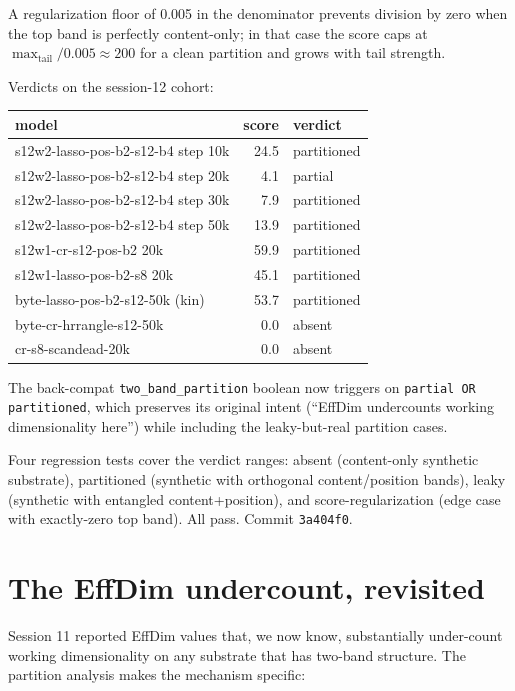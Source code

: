 \documentclass[11pt,openany]{book}
\begin{document}
A regularization floor of 0.005 in the denominator prevents division by
zero when the top band is perfectly content-only; in that case the score
caps at $\max_{\mathrm{tail}}/0.005 \approx 200$ for a clean partition and
grows with tail strength.

Verdicts on the session-12 cohort:

\begin{longtable}{lrl}
\toprule
model & score & verdict \\
\midrule
s12w2-lasso-pos-b2-s12-b4 step 10k  &  24.5 & partitioned \\
s12w2-lasso-pos-b2-s12-b4 step 20k  &   4.1 & partial \\
s12w2-lasso-pos-b2-s12-b4 step 30k  &   7.9 & partitioned \\
s12w2-lasso-pos-b2-s12-b4 step 50k  &  13.9 & partitioned \\
s12w1-cr-s12-pos-b2 20k             &  59.9 & partitioned \\
s12w1-lasso-pos-b2-s8 20k           &  45.1 & partitioned \\
byte-lasso-pos-b2-s12-50k (kin)     &  53.7 & partitioned \\
byte-cr-hrrangle-s12-50k            &   0.0 & absent \\
cr-s8-scandead-20k                  &   0.0 & absent \\
\bottomrule
\end{longtable}

The back-compat \texttt{two\_band\_partition} boolean now triggers on
\texttt{partial OR partitioned}, which preserves its original intent
(``EffDim undercounts working dimensionality here'') while including the
leaky-but-real partition cases.

Four regression tests cover the verdict ranges: absent (content-only synthetic
substrate), partitioned (synthetic with orthogonal content/position bands),
leaky (synthetic with entangled content+position), and score-regularization
(edge case with exactly-zero top band). All pass. Commit \texttt{3a404f0}.

\chapter{The EffDim undercount, revisited}

Session 11 reported EffDim values that, we now know, substantially under-count
working dimensionality on any substrate that has two-band structure. The
partition analysis makes the mechanism specific:
\end{document}
